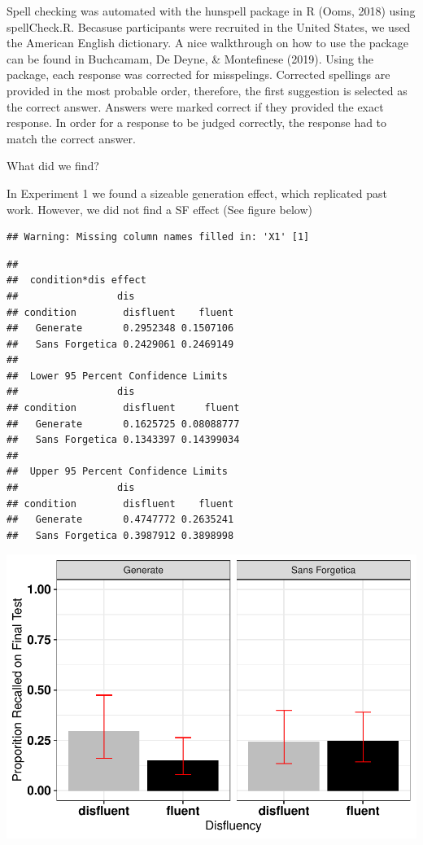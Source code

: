 \documentclass[doc]{apa6}
\begin{document}
Spell checking was automated with the hunspell package in R (Ooms, 2018) using spellCheck.R. Becasuse participants were recruited in the United States, we used the American English dictionary. A nice walkthrough on how to use the package can be found in Buchcamam, De Deyne, \& Montefinese (2019). Using the package, each response was corrected for misspelings. Corrected spellings are provided in the most probable order, therefore, the first suggestion is selected as the correct answer. Answers were marked correct if they provided the exact response. In order for a response to be judged correctly, the response had to match the correct answer.

What did we find?

In Experiment 1 we found a sizeable generation effect, which replicated past work. However, we did not find a SF effect (See figure below)

\begin{verbatim}
## Warning: Missing column names filled in: 'X1' [1]
\end{verbatim}

\begin{verbatim}
## 
##  condition*dis effect
##                 dis
## condition        disfluent    fluent
##   Generate       0.2952348 0.1507106
##   Sans Forgetica 0.2429061 0.2469149
## 
##  Lower 95 Percent Confidence Limits
##                 dis
## condition        disfluent     fluent
##   Generate       0.1625725 0.08088777
##   Sans Forgetica 0.1343397 0.14399034
## 
##  Upper 95 Percent Confidence Limits
##                 dis
## condition        disfluent    fluent
##   Generate       0.4747772 0.2635241
##   Sans Forgetica 0.3987912 0.3898998
\end{verbatim}

\includegraphics{SF_Paper_files/figure-latex/unnamed-chunk-1-1.pdf}
\end{document}
